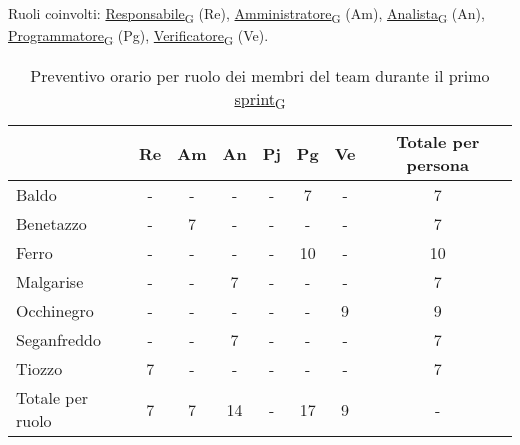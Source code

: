 \newpage
{}
Ruoli coinvolti: \href{https://7last.github.io/docs/pb/documentazione-interna/glossario\#responsabile}{Responsabile\textsubscript{G}} (Re), \href{https://7last.github.io/docs/pb/documentazione-interna/glossario\#amministratore}{Amministratore\textsubscript{G}} (Am), \href{https://7last.github.io/docs/pb/documentazione-interna/glossario\#analista}{Analista\textsubscript{G}} (An), \href{https://7last.github.io/docs/pb/documentazione-interna/glossario\#programmatore}{Programmatore\textsubscript{G}} (Pg), \href{https://7last.github.io/docs/pb/documentazione-interna/glossario\#verificatore}{Verificatore\textsubscript{G}} (Ve).
\begin{table}[!h]
	\centering
	\begin{tabular}{ | l | c | c | c | c | c | c | c | }
		\hline
		\textbf{}        & \textbf{Re} & \textbf{Am} & \textbf{An} & \textbf{Pj} & \textbf{Pg} & \textbf{Ve} & \textbf{Totale per persona} \\
		\hline
		Baldo            & -           & -           & -           & -           & 7           & -           & 7                           \\
		Benetazzo        & -           & 7           & -           & -           & -           & -           & 7                           \\
		Ferro            & -           & -           & -           & -           & 10          & -           & 10                          \\
		Malgarise        & -           & -           & 7           & -           & -           & -           & 7                           \\
		Occhinegro       & -           & -           & -           & -           & -           & 9           & 9                           \\
		Seganfreddo      & -           & -           & 7           & -           & -           & -           & 7                           \\
		Tiozzo           & 7           & -           & -           & -           & -           & -           & 7                           \\
		\hline
		Totale per ruolo & 7           & 7           & 14          & -           & 17          & 9           & -                           \\
		\hline
	\end{tabular}
	\caption{Preventivo orario per ruolo dei membri del team durante il primo \href{https://7last.github.io/docs/pb/documentazione-interna/glossario\#sprint}{sprint\textsubscript{G}}}
	
\end{table}

